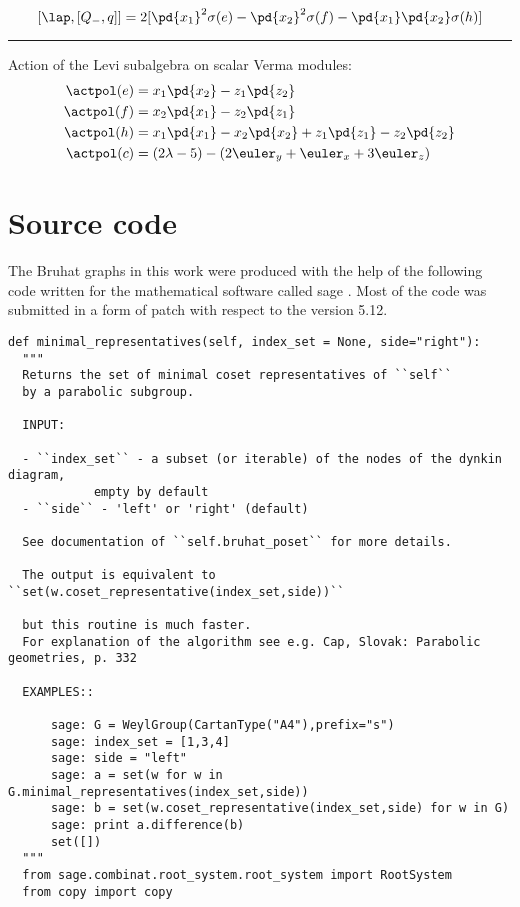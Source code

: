 \begin{appendices}
\[
    [\lap, [Q_-,q]] = 2[\pd{x_1}^2\sigma(e) - \pd{x_2}^2\sigma(f) - \pd{x_1}\pd{x_2}\sigma(h)]
\]

\bigskip
\hrule
\bigskip

Action of the Levi subalgebra on scalar Verma modules:
\begin{align}
    \actpol(e) &= x_1 \pd{x_2} - z_1 \pd{z_2} \\
    \actpol(f) &= x_2 \pd{x_1} - z_2 \pd{z_1} \\
    \actpol(h) &= x_1 \pd{x_1} - x_2 \pd{x_2} + z_1 \pd{z_1} - z_2 \pd{z_2} \\
    \actpol(c) &= (2\lambda -5) - (2 \euler_y + \euler_x + 3 \euler_z)
\end{align}

\chapter{Source code}

The Bruhat graphs in this work were produced with the help of the following code written for the mathematical software called sage \cite{sage}. Most of the code was submitted in a form of patch with respect to the version 5.12.

\begin{verbatim}
def minimal_representatives(self, index_set = None, side="right"):
  """
  Returns the set of minimal coset representatives of ``self``
  by a parabolic subgroup. 

  INPUT:

  - ``index_set`` - a subset (or iterable) of the nodes of the dynkin diagram,
		    empty by default
  - ``side`` - 'left' or 'right' (default)

  See documentation of ``self.bruhat_poset`` for more details.

  The output is equivalent to ``set(w.coset_representative(index_set,side))``
      
  but this routine is much faster. 
  For explanation of the algorithm see e.g. Cap, Slovak: Parabolic geometries, p. 332

  EXAMPLES::
      
      sage: G = WeylGroup(CartanType("A4"),prefix="s")
      sage: index_set = [1,3,4]
      sage: side = "left"
      sage: a = set(w for w in G.minimal_representatives(index_set,side))
      sage: b = set(w.coset_representative(index_set,side) for w in G)
      sage: print a.difference(b)
      set([])
  """
  from sage.combinat.root_system.root_system import RootSystem
  from copy import copy
  

\end{verbatim}
\end{appendices}
